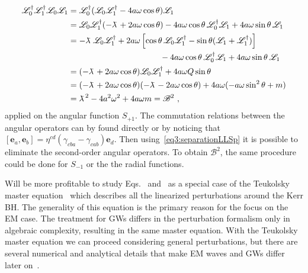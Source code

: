 \begin{align}
    \begin{split}
        \mathscr{L}^\dagger_0 \mathscr{L}^\dagger_1 \mathscr{L}_0 \mathscr{L}_1 &=
        \mathscr{L}^\dagger_0 ( \mathscr{L}_0 \mathscr{L}^\dagger_1 - 4 a\omega \cos\theta )\mathscr{L}_1 \\
        &= \mathscr{L}_0 \mathscr{L}^\dagger_1 ( - \lambdabar + 2 a\omega \cos\theta) - 4 a\omega \cos\theta \,\mathscr{L}^\dagger_0 \mathscr{L}_1 + 4 a\omega \sin\theta \,\mathscr{L}_1 \\
        &= -\lambdabar \, \mathscr{L}_0 \mathscr{L}^\dagger_1 + 2 a\omega \left[ \cos\theta \, \mathscr{L}_0 \mathscr{L}^\dagger_1 -\sin\theta(\mathscr{L}_1+\mathscr{L}^\dagger_1) \right] \\ &\mkern200mu - 4 a\omega \cos\theta \,\mathscr{L}^\dagger_0 \mathscr{L}_1 + 4 a\omega \sin\theta \,\mathscr{L}_1 \\
        &= (-\lambdabar + 2 a\omega \cos\theta ) \mathscr{L}_0 \mathscr{L}^\dagger_1 + 4 a\omega Q \sin\theta \\
        &= (-\lambdabar + 2 a\omega \cos\theta ) (-\lambdabar - 2 a\omega \cos\theta ) + 4 a\omega ( -a\omega \sin^2\theta + m ) \\
        &= \lambdabar^2 - 4 a^2 \omega^2 + 4 a \omega m = \mathscr{B}^2 ~,
    \end{split}
\end{align}
applied on the angular function $S_{+1}$.
The commutation relations between the angular operators can by found directly or by noticing that $[\bm{e}_a,\bm{e}_b]= \eta^{cd} (\gamma_{cba}-\gamma_{cab}) \bm{e}_d$.
Then using~\eqref{eq3:separationLLSp} it is possible to eliminate the second-order angular operators.
To obtain $\mathscr{B}^2$, the same procedure could be done for $S_{-1}$ or the the radial functions.

Will be more profitable to study Eqs.~ and~ as a special case of the Teukolsky master equation~\cite{Teukolsky1972} which describes all the linearized perturbations around the Kerr BH.
The generality of this equation is the primary reason for the focus on the EM case.
The treatment for GWs differs in the perturbation formalism only in algebraic complexity, resulting in the same master equation.
With the Teukolsky master equation we can proceed considering general perturbations, but there are several numerical and analytical details that make EM waves and GWs differ later on~\cite{TeukolskyPress1973b}.

